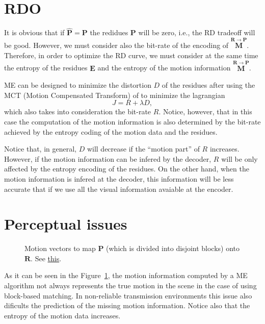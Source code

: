\section{RDO}

It is obvious that if $\hat{{\mathbf P}}={\mathbf P}$ the redidues
${\mathbf P}$ will be zero, i.e., the RD tradeoff will be
good. However, we must consider also the bit-rate of the encoding of
$\overset{{\mathbf R}\rightarrow {\mathbf P}}{\mathbf M}$. Therefore,
in order to optimize the RD curve, we must consider at the same time
the entropy of the residues ${\mathbf E}$ and the entropy of the
motion information $\overset{{\mathbf R}\rightarrow {\mathbf
    P}}{\mathbf M}$.

ME can be designed to minimize the distortion $D$ of the residues
after using the MCT (Motion Compensated Transform) of to minimize the
lagrangian
\begin{equation}
  J = R + \lambda D,
\end{equation}
which also takes into consideration the bit-rate $R$. Notice, however,
that in this case the computation of the motion information is also
determined by the bit-rate achieved by the entropy coding of the
motion data and the residues.

Notice that, in general, $D$ will decrease if the ``motion part'' of
$R$ increases. However, if the motion information can be infered by
the decoder, $R$ will be only affected by the entropy encoding of the
residues. On the other hand, when the motion information is infered at
the decoder, this information will be less accurate that if we use all
the visual information avaiable at the encoder.


\section{Perceptual issues}

\begin{figure}
  \centering
  \caption{Motion vectors to map ${\mathbf P}$ (which is divided into
    disjoint blocks) onto ${\mathbf R}$. See
    \href{https://github.com/Sistemas-Multimedia/Sistemas-Multimedia.github.io/blob/master/milestones/09-ME/full_search_block_ME.ipynb}{this}.}
  \label{fig:MVs_block}
\end{figure}

As it can be seen in the Figure~\ref{fig:MVs_block}, the motion
information computed by a ME algorithm not always represents the true
motion in the scene in the case of using block-based matching. In
non-reliable transmission environments this issue also dificults the
prediction of the missing motion information. Notice also that the
entropy of the motion data increases.


